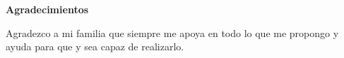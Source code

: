 \begin{center}

{\large \textbf{Agradecimientos}} \linebreak \linebreak \linebreak

Agradezco a mi familia que siempre me apoya en todo lo que me propongo y ayuda para que y sea capaz de realizarlo.

\end{center}
